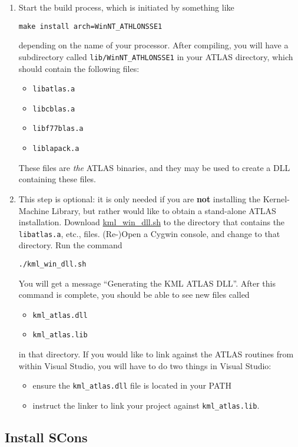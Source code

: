 \documentclass{article}
\begin{document}
\begin{enumerate}
\item Start the build process, which is initiated by something like 
%
\begin{verbatim}
make install arch=WinNT_ATHLONSSE1
\end{verbatim}
%
depending on the name of your processor. After compiling, 
you will have a subdirectory called \texttt{lib/WinNT\_ATHLONSSE1} 
in your ATLAS directory, which should contain the following files:
\begin{itemize}
\item \texttt{libatlas.a}
\item \texttt{libcblas.a}
\item \texttt{libf77blas.a}
\item \texttt{liblapack.a}
\end{itemize}
These files are \emph{the} ATLAS binaries, 
and they may be used to create a DLL containing these files.

\item This step is optional: it is only needed if you are 
\textbf{not} installing the Kernel-Machine Library, but rather
would like to obtain a stand-alone ATLAS installation.
Download 
\href{research/kml/kml\_win\_dll.sh}{kml\_win\_dll.sh}
to the directory that contains the \texttt{libatlas.a}, etc., files.  
(Re-)Open a Cygwin console, and change to that directory. Run the command
%
\begin{verbatim}
./kml_win_dll.sh
\end{verbatim}
%
You will get a message ``Generating
the KML ATLAS DLL''. After this command is complete, you should be able to see new 
files called
\begin{itemize}
\item \texttt{kml\_atlas.dll}
\item \texttt{kml\_atlas.lib}
\end{itemize}
in that directory.
%
If you would like to link against the ATLAS routines from within Visual Studio, 
you will have to do two things in Visual Studio:
\begin{itemize}
\item ensure the \texttt{kml\_atlas.dll} file is located in your PATH
\item instruct the linker to link your project against \texttt{kml\_atlas.lib}.
\end{itemize}


\end{enumerate}

\subsection{Install SCons}
\label{section:install_scons}
\end{document}
